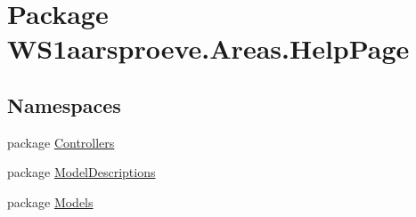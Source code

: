 \hypertarget{namespace_w_s1aarsproeve_1_1_areas_1_1_help_page}{}\section{Package W\+S1aarsproeve.\+Areas.\+Help\+Page}
\label{namespace_w_s1aarsproeve_1_1_areas_1_1_help_page}
\subsection*{Namespaces}
\begin{DoxyCompactItemize}
\item 
package \hyperlink{namespace_w_s1aarsproeve_1_1_areas_1_1_help_page_1_1_controllers}{Controllers}
\item 
package \hyperlink{namespace_w_s1aarsproeve_1_1_areas_1_1_help_page_1_1_model_descriptions}{Model\+Descriptions}
\item 
package \hyperlink{namespace_w_s1aarsproeve_1_1_areas_1_1_help_page_1_1_models}{Models}
\end{DoxyCompactItemize}
